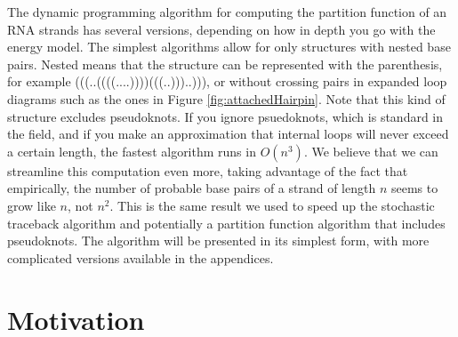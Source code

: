 The dynamic programming algorithm for computing the partition function
of an RNA strands has several versions, depending on how in depth you
go with the energy model. The simplest algorithms allow for only
structures with nested base pairs. Nested means that the structure can
be represented with the parenthesis, for example
(((..((((....))))(((..)))..))), or without crossing pairs in expanded
loop diagrams such as the ones in Figure
\ref{fig:attachedHairpin}. Note that this kind of structure excludes
pseudoknots.  If you ignore psuedoknots, which is standard in the
field, and if you make an approximation that internal loops will never
exceed a certain length, the fastest algorithm runs in $O(n^3)$. We
believe that we can streamline this computation even more, taking
advantage of the fact that empirically, the number of probable base
pairs of a strand of length $n$ seems to grow like $n$, not
$n^2$. This is the same result we used to speed up the stochastic
traceback algorithm and potentially a partition function algorithm
that includes pseudoknots. The algorithm will be presented in its
simplest form, with more complicated versions available in the
appendices.

\section{Motivation}

